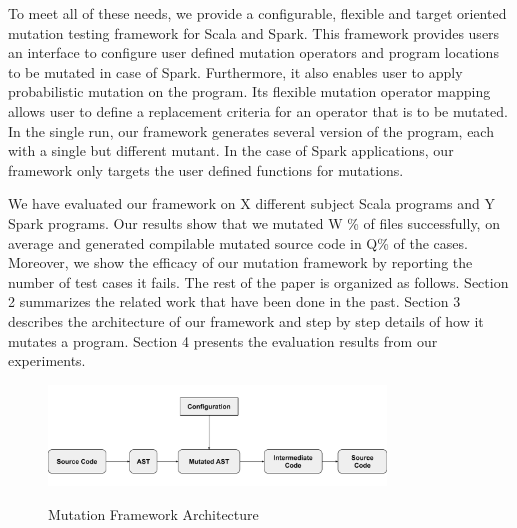 To meet all of these needs, we provide a configurable, flexible and target oriented mutation testing framework for Scala and Spark. This framework provides users an interface to configure user defined mutation operators and program locations to be mutated in case of Spark. Furthermore, it also enables user to apply probabilistic mutation on the program. Its flexible mutation operator mapping allows user to define a replacement criteria for an operator that is to be mutated. In the single run, our framework generates several version of the program, each with a single but different mutant. In the case of Spark applications, our framework only targets the user defined functions for mutations.

We have evaluated our framework on X different subject Scala programs and Y Spark programs. Our results show that we mutated W \% of files successfully, on average and generated compilable mutated source code in Q\% of the cases. Moreover, we show the efficacy of our mutation framework by reporting the number of test cases it fails.
The rest of the paper is organized as follows. Section 2 summarizes the related work that have been done in the past. Section 3 describes the architecture of our framework and step by step details of how it mutates a program. Section 4 presents the evaluation results from our experiments. 
\begin{figure}[ht!]
\begin{center}
\includegraphics[width=0.8\textwidth]{image/flow}
\vspace{-1em}
   \caption{Mutation Framework Architecture}
   \vspace{-1.5em}
        \label{flow}
\end{center}
\end{figure}
